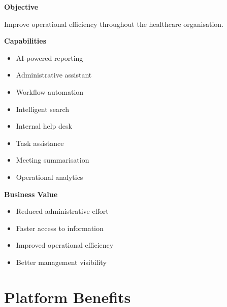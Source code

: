 \begin{capability}

\textbf{Objective}

Improve operational efficiency throughout the healthcare organisation.

\vspace{3mm}

\textbf{Capabilities}

\begin{itemize}

\item AI-powered reporting

\item Administrative assistant

\item Workflow automation

\item Intelligent search

\item Internal help desk

\item Task assistance

\item Meeting summarisation

\item Operational analytics

\end{itemize}

\vspace{3mm}

\textbf{Business Value}

\begin{itemize}

\item Reduced administrative effort

\item Faster access to information

\item Improved operational efficiency

\item Better management visibility

\end{itemize}

\end{capability}


\section{Platform Benefits}

